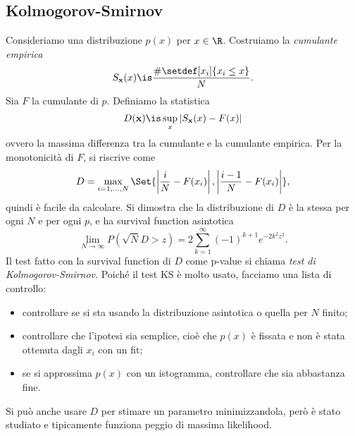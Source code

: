 \subsection{Kolmogorov-Smirnov}

Consideriamo una distribuzione $p(x)$ per $x\in\R$.
Costruiamo la \emph{cumulante empirica} 
\begin{equation*}
	S_{\mathbf x}(x)
	\is \frac {\#\setdef[x_i]{x_i\le x}} N.
\end{equation*}
Sia $F$ la cumulante di $p$.
Definiamo la statistica
\begin{equation*}
	D(\mathbf x)
	\is \sup_x|S_\mathbf x(x)-F(x)|
\end{equation*}
ovvero la massima differenza tra la cumulante e la cumulante empirica.
Per la monotonicità di $F$, si riscrive come
\begin{equation*}
	D = \max_{i=1,\dotsc,N} \Set{\left|\frac iN-F(x_i)\right|, \left|\frac{i-1}N-F(x_i)\right|},
\end{equation*}
quindi è facile da calcolare.
Si dimostra che la distribuzione di $D$ è la stessa per ogni $N$ e per ogni $p$,
e ha survival function asintotica
\begin{equation*}
	\lim_{N\to\infty} P(\sqrt N D>z)
	= 2 \sum_{k=1}^\infty (-1)^{k+1} e^{-2k^2z^2}.
\end{equation*}
Il test fatto con la survival function di $D$ come p-value si chiama \emph{test di Kolmogorov-Smirnov}.
Poiché il test KS è molto usato,
facciamo una lista di controllo:
\begin{itemize}
	\item controllare se si sta usando la distribuzione asintotica o quella per $N$ finito;
	\item controllare che l'ipotesi sia semplice,
	cioè che $p(x)$ è fissata e non è stata ottenuta dagli $x_i$ con un fit;
	\item se si approssima $p(x)$ con un istogramma, controllare che sia abbastanza fine.
\end{itemize}
Si può anche usare $D$ per stimare un parametro minimizzandola,
però è stato studiato e tipicamente funziona peggio di massima likelihood.
